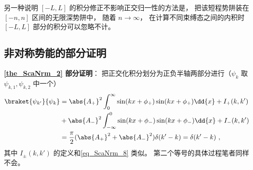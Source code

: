 另一种说明 $[-L,L]$ 的积分修正不影响正交归一性的方法是， 把该短程势阱装在 $[-n,n]$ 区间的无限深势阱中， 随着 $n\to\infty$， 在计算不同束缚态之间的内积时 $[-L,L]$ 部分的积分可以忽略不计。

\subsection{非对称势能的部分证明}
\textbf{\autoref{the_ScaNrm_2} 部分证明}： 把正交化积分划分为正负半轴两部分进行（$\psi_{k}$ 取 $\psi_{k,1}, \psi_{k,2}$ 中一个）
\begin{equation}
\begin{aligned}
\braket{\psi_{k'}}{\psi_{k}} &=
\abs{A_+}^2\int_0^{\infty} \sin(kx + \phi_{+})\sin(kx + \phi_{+}) \dd{x}   + I_+(k,k')\\
&+ \abs{A_-}^2\int_{-\infty}^0 \sin(kx + \phi_{-})\sin(kx + \phi_{-}) \dd{x} + I_-(k,k')\\
&= \frac{\pi}{2}(\abs{A_+}^2 + \abs{A_-}^2)\delta(k'-k) = \delta(k'-k)~,
\end{aligned}
\end{equation}
其中 $I_{\pm}(k,k')$ 的定义和\autoref{eq_ScaNrm_8} 类似。 第二个等号的具体过程笔者同样不会。

